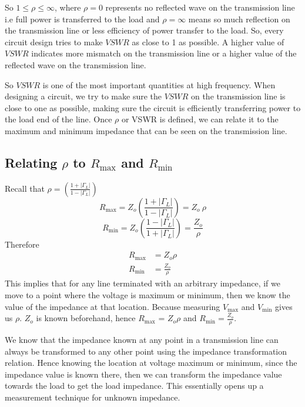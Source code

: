 So $1\leq\rho\leq\infty$, where $\rho=0$ represents no reflected wave on the transmission line i.e full power is transferred to the load and $\rho = \infty$ means so much reflection on the transmission line or less efficiency of power transfer to the load. So, every circuit design tries to make \(VSWR\) as close to 1 as possible. A higher value of \(VSWR\) indicates more mismatch on the transmission line or a higher value of the reflected wave on the transmission line.

So \(VSWR\) is one of the most important quantities at high frequency. When designing a circuit, we try to make sure the \(VSWR\) on the transmission line is close to one as possible, making sure the circuit is efficiently transferring power to the load end of the line. Once $\rho$ or VSWR is defined, we can relate it to the maximum and minimum impedance that can be seen on the transmission line.

\subsection{Relating $\rho$ to $R_{\max}$ and  $R_{\min}$}
Recall that $\rho =  \left(\frac{1 + |\Gamma_L|}{1 - |\Gamma_L|}\right)$
\begin{equation*}
R_{\max}  = Z_o  \left(\frac{1 + |\Gamma_L|}{1 - |\Gamma_L|}\right) = Z_o    \  \rho
\end{equation*}
\begin{equation*}
R_{\min}  = Z_o  \left(\frac{1 - |\Gamma_L|}{1 + |\Gamma_L|}\right) =\frac{Z_o}{\rho}
\end{equation*}
Therefore
\begin{align}
R_{\max} &= Z_o \rho\label{eqn:maximprho}\\
R_{\min} &= \frac{Z_o}{\rho}\label{eqn:minimpeho}
\end{align}
This implies that for any line terminated with an arbitrary impedance, if we move to a point where the voltage is maximum or minimum, then we know the value of the impedance at that location. Because measuring $V_{\max}$ and $V_{\min}$ gives us $\rho$. $Z_o$ is known beforehand, hence $R_{\max}$ = $Z_o \rho$ and $R_{\min} = \frac{Z_o}{\rho}$.

We know that the impedance known at any point in a transmission line can always be transformed to any other point using the impedance transformation relation. Hence knowing the location at voltage maximum or minimum, since the impedance value is known there, then we can transform the impedance value towards the load to get the load impedance. This essentially opens up a measurement technique for unknown impedance.

